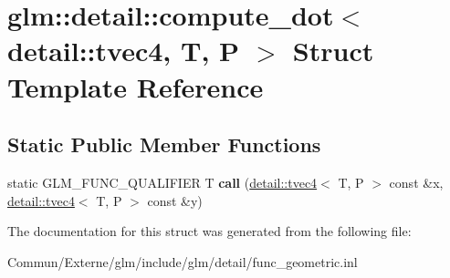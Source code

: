 \hypertarget{structglm_1_1detail_1_1compute__dot_3_01detail_1_1tvec4_00_01_t_00_01_p_01_4}{}\section{glm\+:\+:detail\+:\+:compute\+\_\+dot$<$ detail\+:\+:tvec4, T, P $>$ Struct Template Reference}
\label{structglm_1_1detail_1_1compute__dot_3_01detail_1_1tvec4_00_01_t_00_01_p_01_4}
\subsection*{Static Public Member Functions}
\begin{DoxyCompactItemize}
\item 
static G\+L\+M\+\_\+\+F\+U\+N\+C\+\_\+\+Q\+U\+A\+L\+I\+F\+I\+ER T {\bfseries call} (\hyperlink{structglm_1_1detail_1_1tvec4}{detail\+::tvec4}$<$ T, P $>$ const \&x, \hyperlink{structglm_1_1detail_1_1tvec4}{detail\+::tvec4}$<$ T, P $>$ const \&y)\hypertarget{structglm_1_1detail_1_1compute__dot_3_01detail_1_1tvec4_00_01_t_00_01_p_01_4_acc311c73135c616fd126c216454759e2}{}\label{structglm_1_1detail_1_1compute__dot_3_01detail_1_1tvec4_00_01_t_00_01_p_01_4_acc311c73135c616fd126c216454759e2}

\end{DoxyCompactItemize}


The documentation for this struct was generated from the following file\+:\begin{DoxyCompactItemize}
\item 
Commun/\+Externe/glm/include/glm/detail/func\+\_\+geometric.\+inl\end{DoxyCompactItemize}
